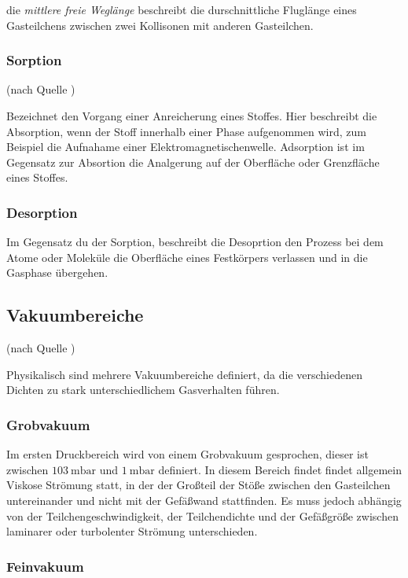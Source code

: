 			die \textit{mittlere freie Weglänge} beschreibt die durschnittliche Fluglänge eines Gasteilchens zwischen zwei Kollisonen mit anderen Gasteilchen.

		\subsubsection{Sorption}(nach Quelle \cite{wiki:sor})
			
			Bezeichnet den Vorgang einer Anreicherung eines Stoffes. 
			Hier beschreibt die Absorption, wenn der Stoff innerhalb einer Phase aufgenommen wird, zum Beispiel die Aufnahame einer Elektromagnetischenwelle.
			Adsorption ist im Gegensatz zur Absortion die Analgerung auf der Oberfläche oder Grenzfläche eines Stoffes.

		\subsubsection{Desorption}

			Im Gegensatz du der Sorption, beschreibt die Desoprtion den Prozess bei dem Atome oder Moleküle die Oberfläche eines Festkörpers verlassen und in die Gasphase übergehen.

	\subsection{Vakuumbereiche}(nach Quelle \cite{pfeiffer:grund})

		Physikalisch sind mehrere Vakuumbereiche definiert, da die verschiedenen Dichten zu stark unterschiedlichem Gasverhalten führen. 

		\subsubsection{Grobvakuum}
			Im ersten Druckbereich wird von einem Grobvakuum gesprochen, dieser ist zwischen $\SI{103}{\milli\bar}$ und $\SI{1}{\milli\bar}$ definiert.
			In diesem Bereich findet findet allgemein Viskose Strömung statt, in der der Großteil der Stöße zwischen den Gasteilchen untereinander und nicht mit der Gefäßwand stattfinden.
			Es muss jedoch abhängig von der Teilchengeschwindigkeit, der Teilchendichte und der Gefäßgröße zwischen laminarer oder turbolenter Strömung unterschieden. 

		\subsubsection{Feinvakuum}

